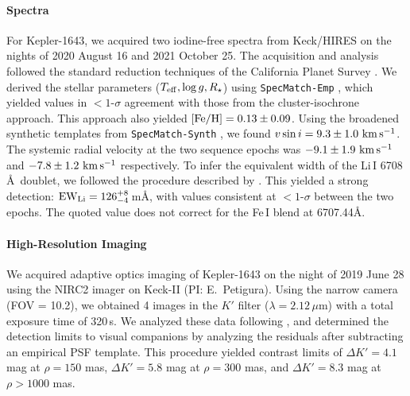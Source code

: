 \documentclass[12pt,twocolumn,linenumbers]{aastex63}
\newcommand{\mkms}{{\rm \,km\,s^{-1}}}  %
\begin{document}
\paragraph{Spectra}
For Kepler-1643, we acquired two iodine-free spectra from Keck/HIRES
on the nights of 2020 August 16 and 2021 October 25.  The acquisition
and analysis followed the standard reduction techniques of the
California Planet Survey \citep{howard_cps_2010}.  We derived the
stellar parameters ($T_{\rm eff}, \log g, R_\star$) using
\texttt{SpecMatch-Emp} \citep{yee_SM_2017}, which yielded values in
$<1$-$\sigma$ agreement with those from the cluster-isochrone
approach.  This approach also yielded $[{\rm Fe/H}]=0.13 \pm 0.09$.
Using the broadened synthetic templates from \texttt{SpecMatch-Synth}
\citep{petigura_cksi_2017}, we found $v\sin i = 9.3 \pm 1.0\,\mkms$.
The systemic radial velocity at the two sequence epochs was $-9.1 \pm
1.9\,\mkms$ and $-7.8\pm 1.2\,\mkms$ respectively.  To infer the
equivalent width of the Li\,\textsc{I} 6708\,\AA\ doublet, we followed
the procedure described by \citet{bouma_2021_ngc2516}.  This yielded a
strong detection: ${\rm EW}_{\rm Li} = 126^{+8}_{-4}$\,m\AA, with
values consistent at $<1$-$\sigma$ between the two epochs.   The
quoted value does not correct for the Fe\,\textsc{I} blend at
6707.44\AA.  


\paragraph{High-Resolution Imaging}
We acquired adaptive optics imaging of Kepler-1643 on the night of
2019 June 28 using the NIRC2 imager on Keck-II (PI: E.~Petigura).
Using the narrow camera (FOV = 10.2\arcsec), we obtained 4 images in
the $K'$ filter ($\lambda = 2.12\,\mu$m) with a total exposure time of
320\,s. We analyzed these data following \citet{kraus_impact_2016},
and determined the detection limits to visual companions by analyzing
the residuals after subtracting an empirical PSF template. 
This procedure yielded contrast limits of $\Delta K' = 4.1$ mag at
$\rho = 150$ mas, $\Delta K' = 5.8$ mag at $\rho = 300$ mas, and
$\Delta K' = 8.3$ mag at $\rho > 1000$ mas.
\end{document}
